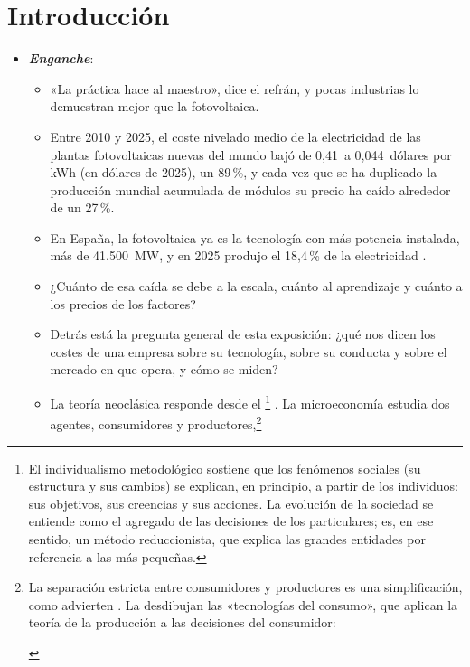 \documentclass[11pt]{article}
\begin{document}
\tceetitulo

\section*{Introducción}

\begin{itemize}
\item \textbf{\emph{Enganche}}:
  \begin{itemize}
  \item «La práctica hace al maestro», dice el refrán, y pocas industrias lo demuestran mejor que la fotovoltaica.
  \item Entre 2010 y 2025, el coste nivelado medio de la electricidad de las plantas fotovoltaicas nuevas del mundo bajó de 0,41~a 0,044~dólares por kWh (en dólares de 2025), un 89\,\%\nocite{IRENA2026CostesGeneracion}, y cada vez que se ha duplicado la producción mundial acumulada de módulos su precio ha caído alrededor de un 27\,\%\nocite{FraunhoferISE2026Photovoltaics}.
  \item En España, la fotovoltaica ya es la tecnología con más potencia instalada, más de 41.500~MW, y en 2025 produjo el 18,4\,\% de la electricidad\nocite{REE2026RenovablesSol} .
  \item ¿Cuánto de esa caída se debe a la escala, cuánto al aprendizaje y cuánto a los precios de los factores?
  \item Detrás está la pregunta general de esta exposición: ¿qué nos dicen los costes de una empresa sobre su tecnología, sobre su conducta y sobre el mercado en que opera, y cómo se miden?
  \item La teoría neoclásica responde desde el \footnote{El individualismo metodológico sostiene que los fenómenos sociales (su estructura y sus cambios) se explican, en principio, a partir de los individuos: sus objetivos, sus creencias y sus acciones. La evolución de la sociedad se entiende como el agregado de las decisiones de los particulares; es, en ese sentido, un método reduccionista, que explica las grandes entidades por referencia a las más pequeñas.} . La microeconomía estudia dos agentes, consumidores y productores,\footnote{La separación estricta entre consumidores y productores es una simplificación, como advierten \textcite{EkelundHebert2013History}. La desdibujan las «tecnologías del consumo», que aplican la teoría de la producción a las decisiones del consumidor:
\begin{itemize}

\end{itemize}}
\end{itemize}
\end{itemize}
\end{document}
